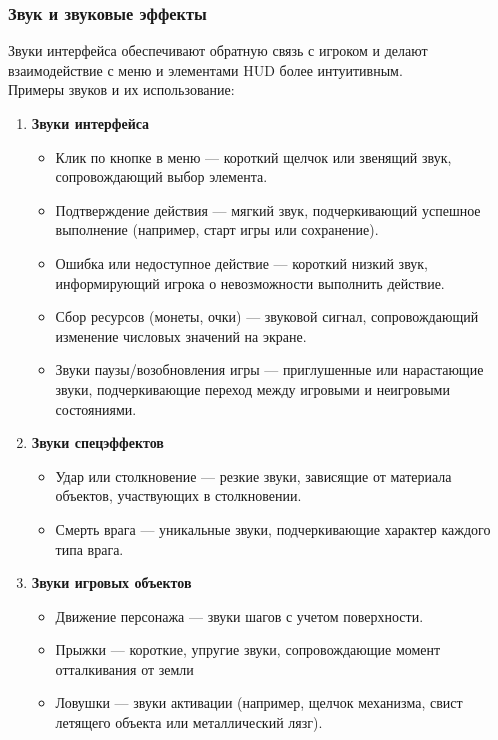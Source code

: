 \documentclass{article}
\begin{document}
\subsubsection{Звук и звуковые эффекты}
    Звуки интерфейса обеспечивают обратную связь с игроком и делают взаимодействие с меню и элементами HUD более интуитивным. \\
Примеры звуков и их использование:
    \begin{enumerate}
    \item \textbf{Звуки интерфейса}
    \begin{itemize}
        \item Клик по кнопке в меню — короткий щелчок или звенящий звук, сопровождающий выбор элемента.
        \item Подтверждение действия — мягкий звук, подчеркивающий успешное выполнение (например, старт игры или сохранение).
        \item Ошибка или недоступное действие — короткий низкий звук, информирующий игрока о невозможности выполнить действие.
        \item Сбор ресурсов (монеты, очки) — звуковой сигнал, сопровождающий изменение числовых значений на экране.
        \item Звуки паузы/возобновления игры — приглушенные или нарастающие звуки, подчеркивающие переход между игровыми и неигровыми состояниями.
    \end{itemize}
    \item \textbf{Звуки спецэффектов}
    \begin{itemize}
        \item Удар или столкновение — резкие звуки, зависящие от материала объектов, участвующих в столкновении.
        \item Смерть врага — уникальные звуки, подчеркивающие характер каждого типа врага.
    \end{itemize}
    \item \textbf{Звуки игровых объектов}
    \begin{itemize}
        \item Движение персонажа — звуки шагов с учетом поверхности.
        \item Прыжки — короткие, упругие звуки, сопровождающие момент отталкивания от земли
        \item Ловушки — звуки активации (например, щелчок механизма, свист летящего объекта или металлический лязг).
    \end{itemize}
    \end{enumerate}
\end{document}
